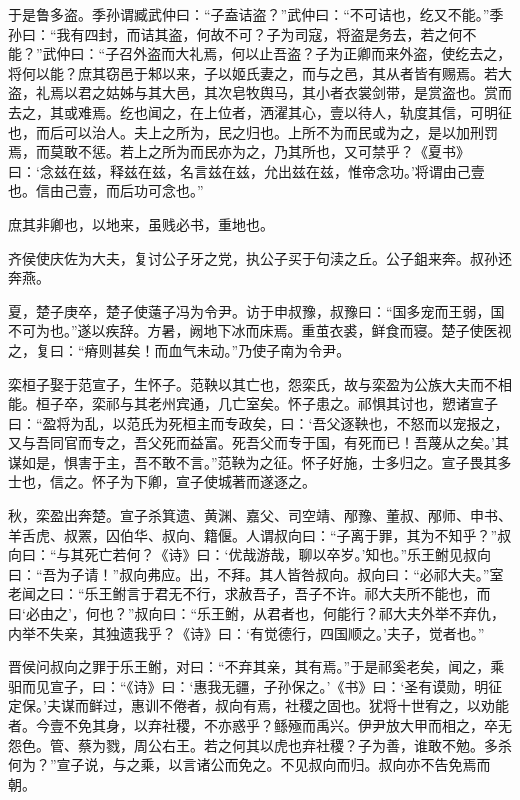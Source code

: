 \documentclass[a4paper,12pt,UTF8,twoside]{ctexbook}
\begin{document}
于是鲁多盗。季孙谓臧武仲曰：“子盍诘盗？”武仲曰：“不可诘也，纥又不能。”季孙曰：“我有四封，而诘其盗，何故不可？子为司寇，将盗是务去，若之何不能？”武仲曰：“子召外盗而大礼焉，何以止吾盗？子为正卿而来外盗，使纥去之，将何以能？庶其窃邑于邾以来，子以姬氏妻之，而与之邑，其从者皆有赐焉。若大盗，礼焉以君之姑姊与其大邑，其次皂牧舆马，其小者衣裳剑带，是赏盗也。赏而去之，其或难焉。纥也闻之，在上位者，洒濯其心，壹以待人，轨度其信，可明征也，而后可以治人。夫上之所为，民之归也。上所不为而民或为之，是以加刑罚焉，而莫敢不惩。若上之所为而民亦为之，乃其所也，又可禁乎？《夏书》曰：‘念兹在兹，释兹在兹，名言兹在兹，允出兹在兹，惟帝念功。’将谓由己壹也。信由己壹，而后功可念也。”

庶其非卿也，以地来，虽贱必书，重地也。

齐侯使庆佐为大夫，复讨公子牙之党，执公子买于句渎之丘。公子鉏来奔。叔孙还奔燕。

夏，楚子庚卒，楚子使薳子冯为令尹。访于申叔豫，叔豫曰：“国多宠而王弱，国不可为也。”遂以疾辞。方暑，阙地下冰而床焉。重茧衣裘，鲜食而寝。楚子使医视之，复曰：“瘠则甚矣！而血气未动。”乃使子南为令尹。

栾桓子娶于范宣子，生怀子。范鞅以其亡也，怨栾氏，故与栾盈为公族大夫而不相能。桓子卒，栾祁与其老州宾通，几亡室矣。怀子患之。祁惧其讨也，愬诸宣子曰：“盈将为乱，以范氏为死桓主而专政矣，曰：‘吾父逐鞅也，不怒而以宠报之，又与吾同官而专之，吾父死而益富。死吾父而专于国，有死而已！吾蔑从之矣。’其谋如是，惧害于主，吾不敢不言。”范鞅为之征。怀子好施，士多归之。宣子畏其多士也，信之。怀子为下卿，宣子使城著而遂逐之。

秋，栾盈出奔楚。宣子杀箕遗、黄渊、嘉父、司空靖、邴豫、董叔、邴师、申书、羊舌虎、叔罴，囚伯华、叔向、籍偃。人谓叔向曰：“子离于罪，其为不知乎？”叔向曰：“与其死亡若何？《诗》曰：‘优哉游哉，聊以卒岁。’知也。”乐王鲋见叔向曰：“吾为子请！”叔向弗应。出，不拜。其人皆咎叔向。叔向曰：“必祁大夫。”室老闻之曰：“乐王鲋言于君无不行，求赦吾子，吾子不许。祁大夫所不能也，而曰‘必由之’，何也？”叔向曰：“乐王鲋，从君者也，何能行？祁大夫外举不弃仇，内举不失亲，其独遗我乎？《诗》曰：‘有觉德行，四国顺之。’夫子，觉者也。”

晋侯问叔向之罪于乐王鲋，对曰：“不弃其亲，其有焉。”于是祁奚老矣，闻之，乘驲而见宣子，曰：“《诗》曰：‘惠我无疆，子孙保之。’《书》曰：‘圣有谟勋，明征定保。’夫谋而鲜过，惠训不倦者，叔向有焉，社稷之固也。犹将十世宥之，以劝能者。今壹不免其身，以弃社稷，不亦惑乎？鲧殛而禹兴。伊尹放大甲而相之，卒无怨色。管、蔡为戮，周公右王。若之何其以虎也弃社稷？子为善，谁敢不勉。多杀何为？”宣子说，与之乘，以言诸公而免之。不见叔向而归。叔向亦不告免焉而朝。
\end{document}
